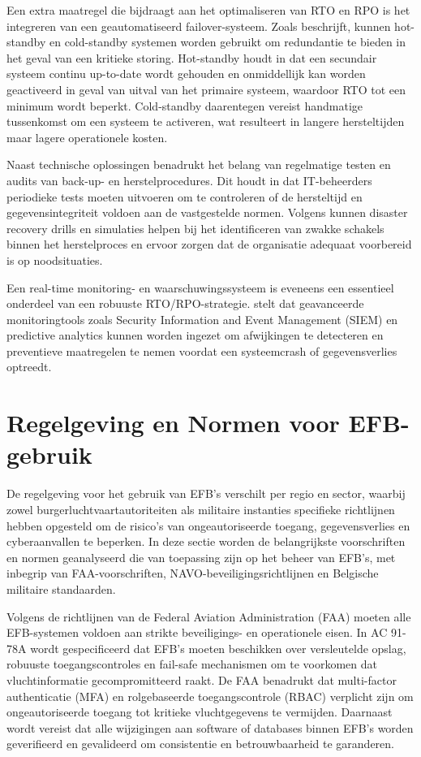 Een extra maatregel die bijdraagt aan het optimaliseren van RTO en RPO is het integreren van een geautomatiseerd failover-systeem. Zoals \textcite{EFBDataSecurity} beschrijft, kunnen hot-standby en cold-standby systemen worden gebruikt om redundantie te bieden in het geval van een kritieke storing. Hot-standby houdt in dat een secundair systeem continu up-to-date wordt gehouden en onmiddellijk kan worden geactiveerd in geval van uitval van het primaire systeem, waardoor RTO tot een minimum wordt beperkt. Cold-standby daarentegen vereist handmatige tussenkomst om een systeem te activeren, wat resulteert in langere hersteltijden maar lagere operationele kosten.

Naast technische oplossingen benadrukt \textcite{SkybraryEFB} het belang van regelmatige testen en audits van back-up- en herstelprocedures. Dit houdt in dat IT-beheerders periodieke tests moeten uitvoeren om te controleren of de hersteltijd en gegevensintegriteit voldoen aan de vastgestelde normen. Volgens \textcite{AD070001} kunnen disaster recovery drills en simulaties helpen bij het identificeren van zwakke schakels binnen het herstelproces en ervoor zorgen dat de organisatie adequaat voorbereid is op noodsituaties.

Een real-time monitoring- en waarschuwingssysteem is eveneens een essentieel onderdeel van een robuuste RTO/RPO-strategie. \textcite{ACISAPGSECVEIL004} stelt dat geavanceerde monitoringtools zoals Security Information and Event Management (SIEM) en predictive analytics kunnen worden ingezet om afwijkingen te detecteren en preventieve maatregelen te nemen voordat een systeemcrash of gegevensverlies optreedt.
        
\section{Regelgeving en Normen voor EFB-gebruik}

De regelgeving voor het gebruik van EFB’s verschilt per regio en sector, waarbij zowel burgerluchtvaartautoriteiten als militaire instanties specifieke richtlijnen hebben opgesteld om de risico’s van ongeautoriseerde toegang, gegevensverlies en cyberaanvallen te beperken. In deze sectie worden de belangrijkste voorschriften en normen geanalyseerd die van toepassing zijn op het beheer van EFB’s, met inbegrip van FAA-voorschriften, NAVO-beveiligingsrichtlijnen en Belgische militaire standaarden.

Volgens de richtlijnen van de Federal Aviation Administration (FAA) moeten alle EFB-systemen voldoen aan strikte beveiligings- en operationele eisen. In AC 91-78A \autocite{FAA_AC91-78A} wordt gespecificeerd dat EFB’s moeten beschikken over versleutelde opslag, robuuste toegangscontroles en fail-safe mechanismen om te voorkomen dat vluchtinformatie gecompromitteerd raakt. De FAA benadrukt dat multi-factor authenticatie (MFA) en rolgebaseerde toegangscontrole (RBAC) verplicht zijn om ongeautoriseerde toegang tot kritieke vluchtgegevens te vermijden. Daarnaast wordt vereist dat alle wijzigingen aan software of databases binnen EFB’s worden geverifieerd en gevalideerd om consistentie en betrouwbaarheid te garanderen.

